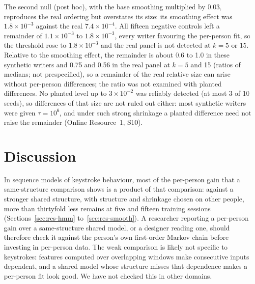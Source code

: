 \documentclass[pdflatex,sn-basic]{sn-jnl}
\newcommand{\Sref}[1]{Online Resource~1, S#1}
\begin{document}
The second null (post hoc), with the base smoothing multiplied by 0.03, reproduces the real ordering but overstates its size: its smoothing effect was $1.8\times10^{-3}$ against the real $7.4\times10^{-4}$. All fifteen negative controls left a remainder of $1.1\times10^{-3}$ to $1.8\times10^{-3}$, every writer favouring the per-person fit, so the threshold rose to $1.8\times10^{-3}$ and the real panel is not detected at $k=5$ or 15. Relative to the smoothing effect, the remainder is about 0.6 to 1.0 in these synthetic writers and 0.75 and 0.56 in the real panel at $k=5$ and 15 (ratios of medians; not prespecified), so a remainder of the real relative size can arise without per-person differences; the ratio was not examined with planted differences. No planted level up to $3\times10^{-2}$ was reliably detected (at most 3 of 10 seeds), so differences of that size are not ruled out either: most synthetic writers were given $\tau=10^6$, and under such strong shrinkage a planted difference need not raise the remainder (\Sref{10}).

\section{Discussion}\label{sec:discussion}

In sequence models of keystroke behaviour, most of the per-person gain that a same-structure comparison shows is a product of that comparison: against a stronger shared structure, with structure and shrinkage chosen on other people, more than thirtyfold less remains at five and fifteen training sessions (Sections~\ref{sec:res-hmm} to~\ref{sec:res-smooth}). A researcher reporting a per-person gain over a same-structure shared model, or a designer reading one, should therefore check it against the person's own first-order Markov chain before investing in per-person data. The weak comparison is likely not specific to keystrokes: features computed over overlapping windows make consecutive inputs dependent, and a shared model whose structure misses that dependence makes a per-person fit look good. We have not checked this in other domains.
\end{document}

